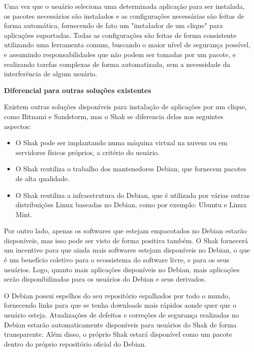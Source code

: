 Uma vez que o usuário seleciona uma determinada aplicação para
ser instalada, os pacotes necessários são instalados e as configurações
necessárias são feitas de forma automática, fornecendo de fato um "instalador
de um clique" para aplicações suportadas. Todas as configurações são feitas de
forma consistente utilizando uma ferramenta comum, buscando o maior nível de
segurança possível, e assumindo responsabilidades que não podem ser tomadas por
um pacote, e realizando tarefas complexas de forma automatizada, sem a necessidade
da interferência de algum usuário.

\textbf{Diferencial para outras soluções existentes}

Existem outras soluções disponíveis para instalação de aplicações por um clique,
como Bitnami e Sandstorm, mas o Shak se
diferencia delas nos seguintes aspectos:

\begin{itemize}
  \item O Shak pode ser implantando numa máquina virtual na nuvem ou em servidores físicos
    próprios, a critério do usuário.

  \item O Shak reutiliza o trabalho dos mantenedores Debian, que fornecem pacotes
    de alta qualidade.

  \item O Shak reutiliza a infraestrutura do Debian, que é utilizada por várias
outras distribuições Linux baseadas no Debian, como por exemplo: Ubuntu e Linux Mint.

\end{itemize}

Por outro lado, apenas os softwares que estejam empacotados no Debian estarão
disponíveis, mas isso pode ser visto de forma positiva também. O Shak
fornecerá um incentivo para que ainda mais softwares estejam disponíveis no
Debian, o que é um benefício coletivo para o ecossistema do software livre, e
para os seus usuários. Logo, quanto mais aplicações disponíveis no Debian,
mais aplicações serão disponibilizadas para os usuários do Debian e seus derivados.

O Debian possui espelhos do seu repositório espalhados por todo o mundo,
fornecendo links para que se tenha downloads mais rápidos aonde quer que o usuário esteja.
Atualizações de defeitos e correções de segurança realizadas no Debian estarão
automaticamente disponíveis para usuários do Shak de forma transparente. Além disso,
o próprio Shak estará disponível como um pacote dentro do próprio repositório oficial do Debian.

